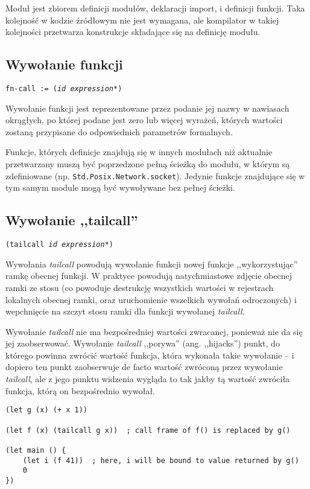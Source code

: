 Moduł jest zbiorem definicji modułów, deklaracji import, i definicji funkcji.
Taka kolejność w kodzie źródłowym nie jest wymagana, ale kompilator w takiej kolejności przetwarza konstrukcje
składające się na definicję modułu.

\subsection{Wywołanie funkcji}
\label{viuact_spec_fn_call}

\texttt{fn-call := (\emph{id} \emph{expression}*)}
\newline

Wywołanie funkcji jest reprezentowane przez podanie jej nazwy w nawiasach okrągłych, po której podane jest
zero lub więcej wyrażeń, których wartości zostaną przypisane do odpowiednich parametrów formalnych.

Funkcje, których definicje znajdują się w innych modułach niż aktualnie przetwarzany muszą być poprzedzone
pełną ścieżką do modułu, w którym są zdefiniowane (np. \texttt{Std.Posix.Network.socket}). Jedynie funkcje
znajdujące się w tym samym module mogą być wywoływane bez pełnej ścieżki.

\subsection{Wywołanie ,,tailcall''}
\label{viuact_spec_tail_call}

\texttt{(tailcall \emph{id} \emph{expression}*)}
\newline

Wywołania \emph{tailcall} powodują wywołanie funkcji nowej funkcje ,,wykorzystując'' ramkę obecnej funkcji.
W praktyce powodują natychmiastowe zdjęcie obecnej ramki ze stosu (co powoduje destrukcję wszystkich wartości
w rejestrach lokalnych obecnej ramki, oraz uruchomienie wszelkich wywołań odroczonych) i wepchnięcie na szczyt
stosu ramki dla funkcji wywołanej \emph{tailcall}.

Wywołanie \emph{tailcall} nie ma bezpośredniej wartości zwracanej, ponieważ nie da się jej zaobserwować.
Wywołanie \emph{tailcall} ,,porywa'' (ang. ,,hijacks'') punkt, do którego powinna zwrócić wartość funkcja,
która wykonała takie wywołanie -- i dopiero ten punkt zaobserwuje de facto wartość zwróconą przez wywołanie
\emph{tailcall}, ale z jego punktu widzenia wygląda to tak jakby tą wartość zwróciła funkcja, którą on
bezpośrednio wywołał.

\begin{lstlisting}
(let g (x) (+ x 1))

(let f (x) (tailcall g x))  ; call frame of f() is replaced by g()

(let main () {
    (let i (f 41))  ; here, i will be bound to value returned by g()
    0
})
\end{lstlisting}

